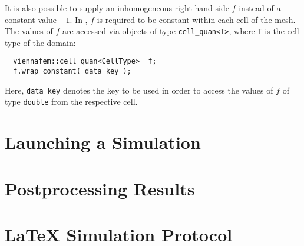 It is also possible to supply an inhomogeneous right hand side $f$ instead of a constant value $-1$.
In {\ViennaMathversion}, $f$ is required to be constant within each cell of the mesh.
The values of $f$ are accessed via objects of type \lstinline|cell_quan<T>|, where \lstinline|T| is the cell type of the {\ViennaGrid}
domain:
\begin{lstlisting}
  viennafem::cell_quan<CellType>  f;
  f.wrap_constant( data_key );  
\end{lstlisting}
Here, \lstinline|data_key| denotes the key to be used in order to access the values of $f$ of type \lstinline|double| from the respective cell.


\section{Launching a Simulation}




\section{Postprocessing Results}



\section{{\LaTeX} Simulation Protocol}



